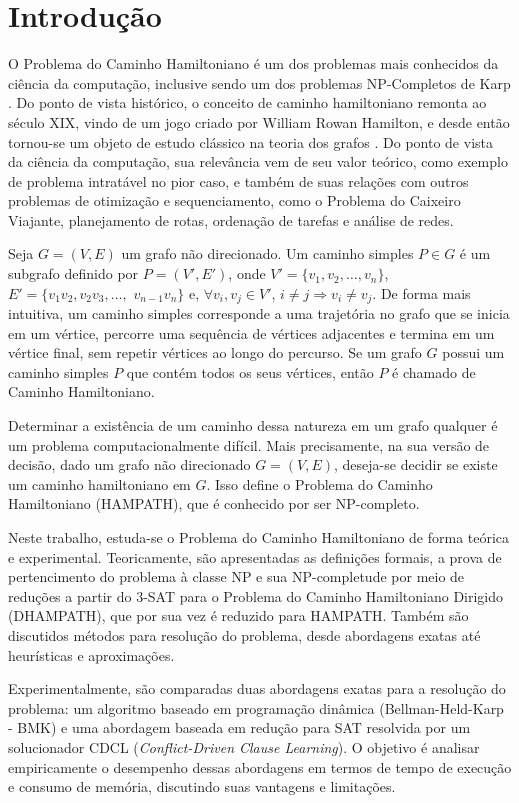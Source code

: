 \section{Introdução}

O Problema do Caminho Hamiltoniano é um dos problemas mais conhecidos da ciência da computação, inclusive sendo um dos problemas NP-Completos de Karp \cite{Karp1972}. Do ponto de vista histórico, o conceito de caminho hamiltoniano remonta ao século XIX, vindo de um jogo criado por William Rowan Hamilton, e desde então tornou-se um objeto de estudo clássico na teoria dos grafos \cite{West2000}. Do ponto de vista da ciência da computação, sua relevância vem de seu valor teórico, como exemplo de problema intratável no pior caso, e também de suas relações com outros problemas de otimização e sequenciamento, como o Problema do Caixeiro Viajante, planejamento de rotas, ordenação de tarefas e análise de redes.

Seja $G = (V, E)$ um grafo não direcionado. Um caminho simples $P \in G$ é um subgrafo definido por $P = (V', E')$, onde $V' = \{v_1, v_2, \ldots,v_n\}$, $E' = \{v_1v_2, v_2v_3, \ldots,$ $v_{n-1}v_n\}$ e, $\forall v_i, v_j \in V'$, $i \neq j \Rightarrow v_i \neq v_j$. De forma mais intuitiva, um caminho simples corresponde a uma trajetória no grafo que se inicia em um vértice, percorre uma sequência de vértices adjacentes e termina em um vértice final, sem repetir vértices ao longo do percurso. Se um grafo $G$ possui um caminho simples $P$ que contém todos os seus vértices, então $P$ é chamado de Caminho Hamiltoniano.

Determinar a existência de um caminho dessa natureza em um grafo qualquer é um problema computacionalmente difícil. Mais precisamente, na sua versão de decisão, dado um grafo não direcionado $G = (V,E)$, deseja-se decidir se existe um caminho hamiltoniano em $G$. Isso define o Problema do Caminho Hamiltoniano (HAMPATH), que é conhecido por ser NP-completo.

Neste trabalho, estuda-se o Problema do Caminho Hamiltoniano de forma teórica e experimental. Teoricamente, são apresentadas as definições formais, a prova de pertencimento do problema à classe NP e sua NP-completude por meio de reduções a partir do 3-SAT para o Problema do Caminho Hamiltoniano Dirigido (DHAMPATH), que por sua vez é reduzido para HAMPATH. Também são discutidos métodos para resolução do problema, desde abordagens exatas até heurísticas e aproximações.

Experimentalmente, são comparadas duas abordagens exatas para a resolução do problema: um algoritmo baseado em programação dinâmica (Bellman-Held-Karp - BMK) e uma abordagem baseada em redução para SAT resolvida por um solucionador CDCL (\textit{Conflict-Driven Clause Learning}). O objetivo é analisar empiricamente o desempenho dessas abordagens em termos de tempo de execução e consumo de memória, discutindo suas vantagens e limitações.
